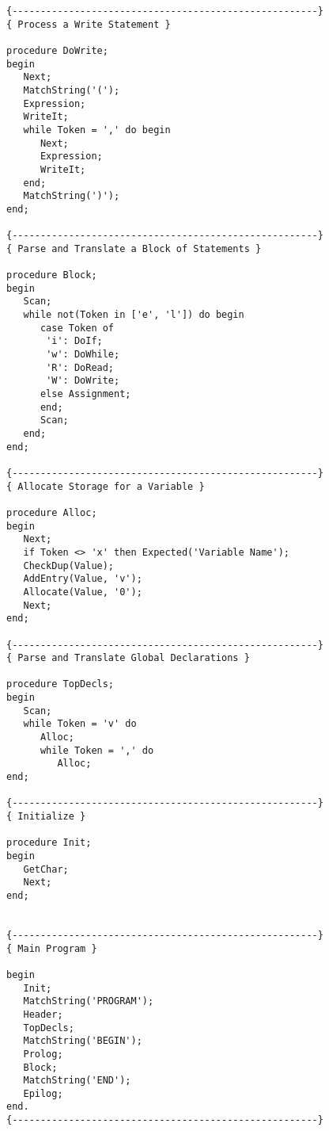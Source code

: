 \begin{verbatim}
{------------------------------------------------------}
{ Process a Write Statement }

procedure DoWrite;
begin
   Next;
   MatchString('(');
   Expression;
   WriteIt;
   while Token = ',' do begin
      Next;
      Expression;
      WriteIt;
   end;
   MatchString(')');
end;

{------------------------------------------------------}
{ Parse and Translate a Block of Statements }

procedure Block;
begin
   Scan;
   while not(Token in ['e', 'l']) do begin
      case Token of
       'i': DoIf;
       'w': DoWhile;
       'R': DoRead;
       'W': DoWrite;
      else Assignment;
      end;
      Scan;
   end;
end;

{------------------------------------------------------}
{ Allocate Storage for a Variable }

procedure Alloc;
begin
   Next;
   if Token <> 'x' then Expected('Variable Name');
   CheckDup(Value);
   AddEntry(Value, 'v');
   Allocate(Value, '0');
   Next;
end;

{------------------------------------------------------}
{ Parse and Translate Global Declarations }

procedure TopDecls;
begin
   Scan;
   while Token = 'v' do
      Alloc;
      while Token = ',' do
         Alloc;
end;

{------------------------------------------------------}
{ Initialize }

procedure Init;
begin
   GetChar;
   Next;
end;


{------------------------------------------------------}
{ Main Program }

begin
   Init;
   MatchString('PROGRAM');
   Header;
   TopDecls;
   MatchString('BEGIN');
   Prolog;
   Block;
   MatchString('END');
   Epilog;
end.
{------------------------------------------------------}
\end{verbatim}
